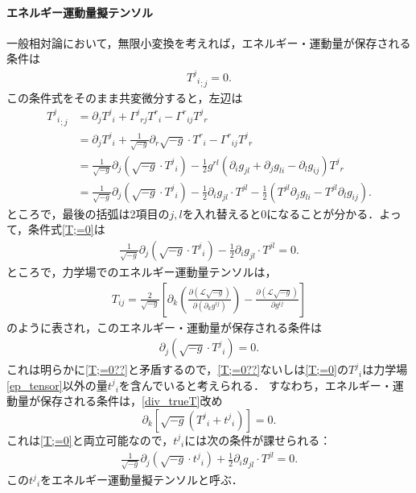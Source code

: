 \documentclass[a4paper]{ltjsreport}
\begin{document}
\paragraph{エネルギー運動量擬テンソル}
一般相対論において，無限小変換を考えれば，エネルギー・運動量が保存される条件は
\begin{align}
  {{T^j}_i}_{;j}=0.\label{T;=0}
\end{align}
この条件式をそのまま共変微分すると，左辺は
\begin{align*}
  {{T^j}_i}_{;j} &= \partial_j{T^j}_i + {\Gamma^j}_{rj}{T^r}_i - {\Gamma^r}_{ij}{T^j}_r\\
  &= \partial_j{T^j}_i + \frac{1}{\sqrt{ - g}}\partial_r\sqrt{ - g}\cdot{T^r}_i - {\Gamma^r}_{ij}{T^j}_r\\
  &= \frac{1}{\sqrt{ - g}}\partial_j\left(\sqrt{ - g}\cdot{T^j}_i\right) - \frac{1}{2}g^{rl}\left(\partial_ig_{jl} + \partial_jg_{li} - \partial_lg_{ij}\right){T^j}_r\\
  &= \frac{1}{\sqrt{ - g}}\partial_j\left(\sqrt{ - g}\cdot{T^j}_i\right) - \frac{1}{2}\partial_ig_{jl}\cdot{}T^{jl} - \frac{1}{2}\left(T^{jl}\partial_jg_{li} - T^{jl}\partial_lg_{ij}\right) .
\end{align*}
ところで，最後の括弧は2項目の$j, l$を入れ替えると0になることが分かる．よって，条件式\eqref{T;=0}は
\begin{align}
  \frac{1}{\sqrt{ - g}}\partial_j\left(\sqrt{ - g}\cdot{T^j}_i\right) - \frac{1}{2}\partial_ig_{jl}\cdot{}T^{jl}=0 . \label{T;=0??}
\end{align}
ところで，力学場でのエネルギー運動量テンソルは，
\begin{align}
  T_{ij}=\frac{2}{\sqrt{ - g}}\left[\partial_k\left(\frac{\partial{}(\mathcal{L}\sqrt{ - g})}{\partial(\partial_k{g^{ij}})}\right) - \frac{\partial(\mathcal{L}\sqrt{ - g})}{\partial{g^{ij}}}\right]
  \label{ep_tensor}
\end{align}
のように表され，このエネルギー・運動量が保存される条件は
\begin{align}
  \partial_j\left(\sqrt{ - g}\cdot{T^j}_i\right)=0 . \label{div_trueT}
\end{align}
これは明らかに\eqref{T;=0??}と矛盾するので，\eqref{T;=0??}ないしは\eqref{T;=0}の${T^j}_i$は力学場\eqref{ep_tensor}以外の量${t^j}_i$を含んでいると考えられる．
すなわち，エネルギー・運動量が保存される条件は，\eqref{div_trueT}改め
\[ \partial_k\left[\sqrt{ - g}({T^j}_i + {t^j}_i)\right]=0 . \]
これは\eqref{T;=0}と両立可能なので，${t^j}_i$には次の条件が課せられる：
\begin{align}
  \frac{1}{\sqrt{ - g}}\partial_j\left(\sqrt{ - g}\cdot{t^j}_i\right) + \frac{1}{2}\partial_ig_{jl}\cdot{}T^{jl}=0.\label{pseudo_Eptenosr}
\end{align}
この${t^j}_i$をエネルギー運動量擬テンソルと呼ぶ．
\end{document}
